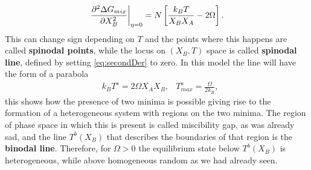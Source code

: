 {    \begin{equation}
        \label{eq:secondDer}
        \eval{\pdv[2]{\Delta G_{mix}}{X_B}}_{\eta=0} = N\left[\frac{k_B T}{X_BX_A} - 2\Omega\right].
    \end{equation}
    This can change sign depending on $T$ and the points where this happens are called \textbf{spinodal points}, while the locus on $(X_B, T)$ space is called \textbf{spinodal line}, defined by setting \eqref{eq:secondDer} to zero. In this model the line will have the form of a parabola
    \begin{align}
        &k_BT^s = 2\Omega X_AX_B, &T^s_{max} = \frac{\Omega}{2k_B},
    \end{align}
    this shows how the presence of two minima is possible giving rise to the formation of a heterogeneous system with regions on the two minima. The region of phase space in which this is present is called miscibility gap, as was already sad, and the line $T^b(X_B)$ that describes the boundaries of that region is the \textbf{binodal line}. Therefore, for $\Omega > 0$ the equilibrium state below $T^b(X_B)$ is heterogeneous, while above homogeneous random as we had already seen.
}